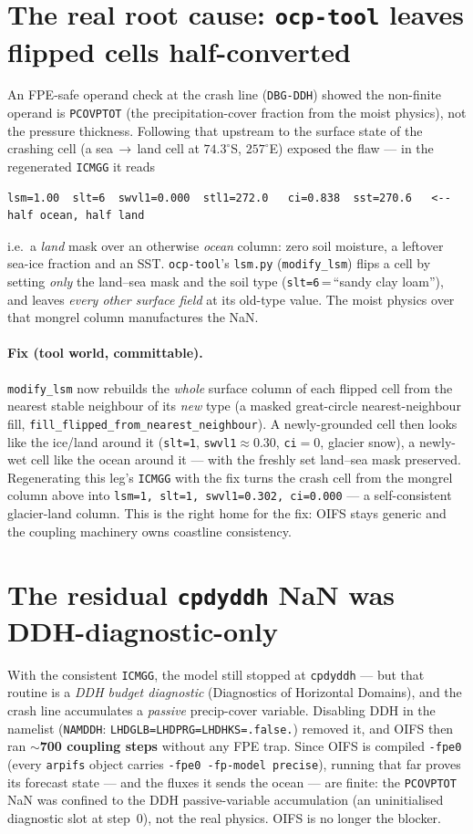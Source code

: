 \documentclass[11pt,a4paper]{article}
\newcommand{\code}[1]{\texttt{\small #1}}
\newcommand{\file}[1]{\texttt{\footnotesize #1}}
\begin{document}
\section{The real root cause: \code{ocp-tool} leaves flipped cells half-converted}\label{sec:ocptool}
An FPE-safe operand check at the crash line (\code{DBG-DDH}) showed the non-finite operand
is \code{PCOVPTOT} (the precipitation-cover fraction from the moist physics), not the
pressure thickness. Following that upstream to the surface state of the crashing cell (a
sea\,$\to$\,land cell at $74.3^\circ$S, $257^\circ$E) exposed the flaw --- in the
regenerated \code{ICMGG} it reads
\begin{lstlisting}
lsm=1.00  slt=6  swvl1=0.000  stl1=272.0   ci=0.838  sst=270.6   <-- half ocean, half land
\end{lstlisting}
i.e.\ a \emph{land} mask over an otherwise \emph{ocean} column: zero soil moisture, a
leftover sea-ice fraction and an SST. \code{ocp-tool}'s \file{lsm.py} (\code{modify\_lsm})
flips a cell by setting \emph{only} the land--sea mask and the soil type
(\code{slt=6}\,=\,``sandy clay loam''), and leaves \emph{every other surface field} at its
old-type value. The moist physics over that mongrel column manufactures the NaN.

\paragraph{Fix (tool world, committable).} \code{modify\_lsm} now rebuilds the \emph{whole}
surface column of each flipped cell from the nearest stable neighbour of its \emph{new}
type (a masked great-circle nearest-neighbour fill, \code{fill\_flipped\_from\_nearest\_neighbour}).
A newly-grounded cell then looks like the ice/land around it (\code{slt=1},
\code{swvl1}$\approx$$0.30$, \code{ci}$=0$, glacier snow), a newly-wet cell like the ocean
around it --- with the freshly set land--sea mask preserved. Regenerating this leg's
\code{ICMGG} with the fix turns the crash cell from the mongrel column above into
\code{lsm=1, slt=1, swvl1=0.302, ci=0.000} --- a self-consistent glacier-land column. This
is the right home for the fix: OIFS stays generic and the coupling machinery owns coastline
consistency.

\section{The residual \code{cpdyddh} NaN was DDH-diagnostic-only}\label{sec:ddh}
With the consistent \code{ICMGG}, the model still stopped at \code{cpdyddh} --- but that
routine is a \emph{DDH budget diagnostic} (Diagnostics of Horizontal Domains), and the
crash line accumulates a \emph{passive} precip-cover variable. Disabling DDH in the
namelist (\code{NAMDDH}: \code{LHDGLB=LHDPRG=LHDHKS=.false.}) removed it, and OIFS then ran
\textbf{$\sim$700 coupling steps} without any FPE trap. Since OIFS is compiled
\code{-fpe0} (every \code{arpifs} object carries \code{-fpe0 -fp-model precise}), running
that far proves its forecast state --- and the fluxes it sends the ocean --- are finite:
the \code{PCOVPTOT} NaN was confined to the DDH passive-variable accumulation (an
uninitialised diagnostic slot at step~0), not the real physics. OIFS is no longer the
blocker.
\end{document}
